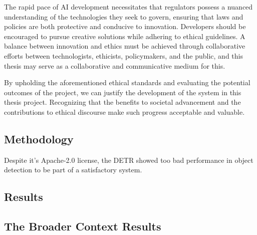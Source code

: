 The rapid pace of AI development necessitates that regulators possess a nuanced understanding of the technologies they seek to govern, ensuring that laws and policies are both protective and conducive to innovation. Developers should be encouraged to pursue creative solutions while adhering to ethical guidelines. A balance between innovation and ethics must be achieved through collaborative efforts between technologists, ethicists, policymakers, and the public, and this thesis may serve as a collaborative and communicative medium for this.

By upholding the aforementioned ethical standards and evaluating the potential outcomes of the project, we can justify the development of the system in this thesis project. Recognizing that the benefits to societal advancement and the contributions to ethical discourse make such progress acceptable and valuable.


\subsection{Methodology}


Despite it's Apache-2.0 license, the DETR showed too bad performance in object detection to be part of a satisfactory system.


\subsection{Results}

\subsection{The Broader Context Results}

